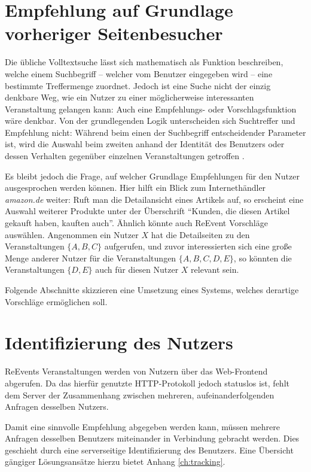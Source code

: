 \section{Empfehlung auf Grundlage vorheriger Seitenbesucher}
\label{sec:poly_recomm}
Die übliche Volltextsuche lässt sich mathematisch als Funktion beschreiben, welche einem Suchbegriff -- welcher vom Benutzer eingegeben wird -- eine bestimmte Treffermenge zuordnet. Jedoch ist eine Suche nicht der einzig denkbare Weg, wie ein Nutzer  zu einer möglicherweise interessanten Veranstaltung gelangen kann: Auch eine Empfehlungs- oder Vorschlagsfunktion wäre denkbar. Von der grundlegenden Logik unterscheiden sich Suchtreffer und Empfehlung nicht: Während beim einen der Suchbegriff entscheidender Parameter ist, wird die Auswahl beim zweiten anhand der Identität des Benutzers oder dessen Verhalten gegenüber einzelnen Veranstaltungen getroffen \cite[S. 571]{Grainger.2014}.

Es bleibt jedoch die Frage, auf welcher Grundlage Empfehlungen für den Nutzer ausgesprochen werden können. Hier hilft ein Blick zum Internethändler \emph{amazon.de} weiter: Ruft man die Detailansicht eines Artikels auf, so erscheint eine Auswahl weiterer Produkte unter der Überschrift \enquote{Kunden, die diesen Artikel gekauft haben, kauften auch}. Ähnlich könnte auch ReEvent Vorschläge auswählen. Angenommen ein Nutzer $X$ hat die Detailseiten zu den Veranstaltungen $\{A, B, C\}$ aufgerufen, und zuvor interessierten sich eine große Menge anderer Nutzer für die Veranstaltungen $\{A, B, C, D, E\}$, so könnten die Veranstaltungen $\{D, E\}$ auch für diesen Nutzer $X$ relevant sein.

Folgende Abschnitte skizzieren eine Umsetzung eines Systems, welches derartige Vorschläge ermöglichen soll.

\section{Identifizierung des Nutzers}
\label{sec:poly_ident}

ReEvents Veranstaltungen werden von Nutzern über das Web-Frontend abgerufen. Da das hierfür genutzte HTTP-Protokoll jedoch statuslos ist, fehlt dem Server der Zusammenhang zwischen mehreren, aufeinanderfolgenden Anfragen desselben Nutzers.

Damit eine sinnvolle Empfehlung abgegeben werden kann, müssen mehrere Anfragen desselben Benutzers miteinander in Verbindung gebracht werden. Dies geschieht durch eine serverseitige Identifizierung des Benutzers. Eine Übersicht gängiger Lösungsansätze hierzu bietet Anhang \ref{ch:tracking}.



